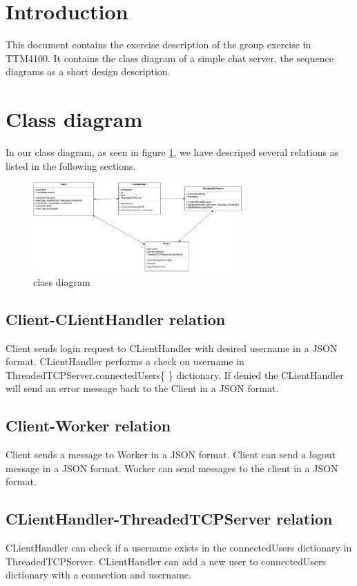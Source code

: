 \documentclass[a4paper, english, 12pt]{article}
\begin{document}

\section{Introduction}
This document contains the exercise description of the group exercise in TTM4100. It contains the class diagram of a simple chat server, the sequence diagrams as a short design description.

\section{Class diagram}
In our class diagram, as seen in figure \ref{class}, we have descriped several relations as listed in the following sections.

\begin{figure}[h!] 
    \begin{center}  
    	\includegraphics[width=8cm]{ktnClassDiagram.png}
		\caption{class diagram}
	\label{class}
	\end{center}
\end{figure}

\subsection{Client-CLientHandler relation}
Client sends login request to CLientHandler with desired username in a JSON format. CLientHandler performs a check on username in ThreadedTCPServer.connectedUsers\{ \} dictionary. If denied the CLientHandler will send an error message back to the Client in a JSON format. 

\subsection{Client-Worker relation}
Client sends a message to Worker in a JSON format. Client can send a logout message in a JSON format. Worker can send messages to the client in a JSON format. 

\subsection{CLientHandler-ThreadedTCPServer relation}
CLientHandler can check if a username exists in the connectedUsers dictionary in ThreadedTCPServer. CLientHandler can add a new user to connectedUsers dictionary with a connection and username.
\end{document}
